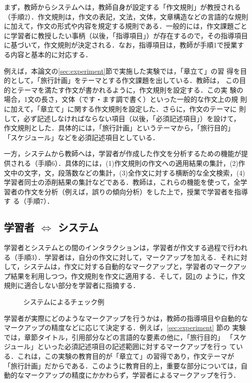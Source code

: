 \documentclass[japanese]{jnlp_1.4}
\def\modl{}
\begin{document}
まず，教師からシステムへは，教師自身が設定する「作文規則」が教授される
（手順2）．作文規則は，作文の表記，文法，文体，文章構造などの言語的な規則
に加えて，作文の形式や内容を規定する規則である．一般的には，作文課題ごと
に学習者に教授したい事柄（以後，「指導項目」）が存在するので，その指導項目
に基づいて，作文規則が決定される．なお，指導項目は，教師が手順1で授業す
る内容と基本的に対応する．

例えば，本論文の\ref{sec:experiment}節で実施した実験では，「章立て」の習
得を目的として，「旅行計画」をテーマとする作文課題を出している．教師は，
この目的とテーマを満たす作文が書かれるように，作文規則を設定する．この実
験の場合，1文の長さ，文体（です・ます調で書く）といった一般的な作文上の規
則に加えて，「章立て」に関する作文規則を設定した．さらに，作文のテーマに
則して，必ず記述しなければならない項目（以後，「必須記述項目」）を設けて，
作文規則とした．具体的には，「旅行計画」というテーマから，「旅行目的」
「スケジュール」などを必須記述項目としている．

一方，システムから教師へは，学習者が作成した作文を分析するための機能が提
供される（手順6）．具体的には，(1)作文規則の作文への適用結果の集計，(2)作
文中の文字，文，段落数などの集計，(3)全作文に対する横断的な全文検索，(4) 
学習者同士の添削結果の集計などである．教師は，これらの機能を使って，全学
習者の作文を分析（例えば，誤りの傾向分析）をした上で，授業で学習者を指導す
る（手順7）．



\subsection{学習者 $\Leftrightarrow$ システム}
\label{ssec:model_student_sys} 

学習者とシステムとの間のインタラクションは，学習者が作文する過程で行われ
る（手順3）．学習者は，自分の作文に対して，マークアップを加える．それに対
して，システムは，作文に対する自動的なマークアップと，学習者のマークアッ
プ結果を利用しつつ，作文規則を作文に適用する．そして，図\ref{fig:check}の
ように，作文規則に適合しない部分を学習者に指摘する．


\begin{figure}[b]

\caption{システムによるチェック例}\label{fig:check}
\end{figure}


学習者が実際にどのようなマークアップを行うかは，教師の指導項目や自動的な
マークアップの精度などに応じて決定する．例えば，\ref{sec:experiment} 節の
実験では，章節タイトル，引用部分などの言語的な要素の他に，「旅行目的」
「スケジュール」といった必須記述項目の記述範囲に対するマークアップを行っ
ている．{\modl これは，この実験の教育目的が「章立て」の習得であり，作文テーマが
「旅行計画」だからである．このように教育目的上，重要な部分については，自
動的なマークアップの精度にかかわらず，学習者によるマークアップを行う．}
\end{document}
